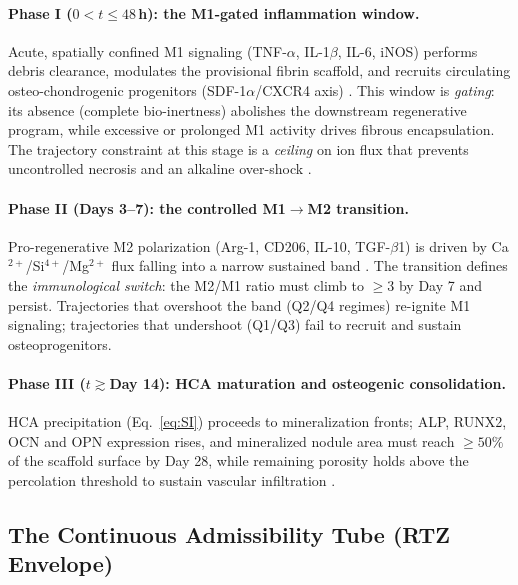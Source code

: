 \documentclass[11pt]{article}
\begin{document}
\paragraph{Phase I ($0<t\leq48$\,h): the M1-gated inflammation window.}
Acute, spatially confined M1 signaling (TNF-$\alpha$, IL-1$\beta$, IL-6, iNOS) performs debris clearance, modulates the provisional fibrin scaffold, and recruits circulating osteo-chondrogenic progenitors (SDF-1$\alpha$/CXCR4 axis) \cite{Miron2016,Francois2018}. This window is \emph{gating}: its absence (complete bio-inertness) abolishes the downstream regenerative program, while excessive or prolonged M1 activity drives fibrous encapsulation. The trajectory constraint at this stage is a \emph{ceiling} on ion flux that prevents uncontrolled necrosis and an alkaline over-shock \cite{Polo-Montalvo2021}.


\paragraph{Phase II (Days 3--7): the controlled M1$\rightarrow$M2 transition.}
Pro-regenerative M2 polarization (Arg-1, CD206, IL-10, TGF-$\beta$1) is driven by Ca$^{2+}$/Si$^{4+}$/Mg$^{2+}$ flux falling into a narrow sustained band \cite{Polo-Montalvo2021,Zhang2021}. The transition defines the \emph{immunological switch}: the M2/M1 ratio must climb to $\geq3$ by Day 7 and persist. Trajectories that overshoot the band (Q2/Q4 regimes) re-ignite M1 signaling; trajectories that undershoot (Q1/Q3) fail to recruit and sustain osteoprogenitors.


\paragraph{Phase III ($t\gtrsim$Day 14): HCA maturation and osteogenic consolidation.}
HCA precipitation (Eq.~\eqref{eq:SI}) proceeds to mineralization fronts; ALP, RUNX2, OCN and OPN expression rises, and mineralized nodule area must reach $\geq50\%$ of the scaffold surface by Day 28, while remaining porosity holds above the percolation threshold to sustain vascular infiltration \cite{Xynos2000,Workie2023}.


\subsection{The Continuous Admissibility Tube (RTZ Envelope)}
\end{document}
